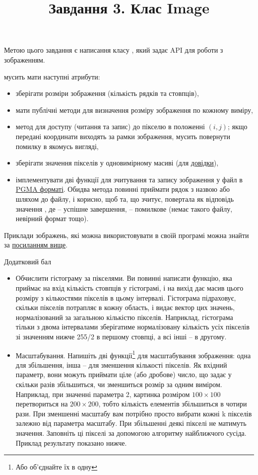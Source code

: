 \documentclass[12pt]{article}
\title{Завдання 3. Клас Image}
\begin{document}
\maketitle
Метою цього завдання є написання класу , який задає API для роботи з зображенням.

 мусить мати наступні атрибути:
\begin{itemize}
  \item зберігати розміри зображення (кількість рядків та стовпців),
  \item мати публічні методи для визначення розміру зображення по кожному виміру,
  \item метод  для доступу (читання та запис) до пікселю в положенні $(i, j)$; якщо передані координати виходять за рамки зображення,  мусить повернути помилку в якомусь вигляді,
  \item зберігати значення пікселів у одновимірному масиві (для \href{https://en.wikipedia.org/wiki/Row-_and_column-major_order}{довідки}),
  \item імплементувати дві функції для зчитування та запису зображення у файл в \href{https://people.sc.fsu.edu/~jburkardt/data/pgma/pgma.html}{PGMA форматі}. Обидва метода повинні приймати рядок з назвою або шляхом до файлу, і корисно, щоб та, що зчитує, повертала як відповідь значення , де  -- успішне завершення,  -- помилкове (немає такого файлу, невірний формат тощо).
\end{itemize}
Приклади зображень, які можна використовувати в своїй програмі можна знайти за \href{https://people.sc.fsu.edu/~jburkardt/data/pgma/pgma.html}{посиланням вище}.

\begin{center}
    \large{Додатковий бал}
\end{center}

\begin{itemize}
\item Обчислити гістограму за пікселями. Ви повинні написати функцію, яка приймає на вхід кількість стовпців у гістограмі, і на вихід дає масив цього розміру з кількостями пікселів в цьому інтервалі. Гістограма підраховує, скільки пікселів потрапляє в кожну область, і видає вектор цих значень, нормалізований за загальною кількістю пікселів. Наприклад, гістограма тільки з двома інтервалами зберігатиме нормалізовану кількість усіх пікселів зі значенням нижче 255/2 в першому стовпці, а всі інші -- в другому.
\item Масштабування. Напишіть дві функції\footnote{Або об'єднайте їх в одну} для масштабування зображення: одна для збільшення, інша -- для зменшення кількості пікселів. Як вхідний параметр, вони можуть приймати ціле (або дробове) число, що задає у скільки разів збільшиться, чи зменшиться розмір за одним виміром. Наприклад, при значенні параметра 2, картинка розміром $100\times100$ перетвориться на $200\times200$, тобто кількість елементів збільшиться в чотири рази. При зменшенні масштабу вам потрібно просто вибрати кожні k пікселів залежно від параметра масштабу. При збільшенні деякі пікселі не матимуть значення. Заповніть ці пікселі за допомогою алгоритму найближчого сусіда. Приклад результату показано нижче.
\end{itemize}
\end{document}

